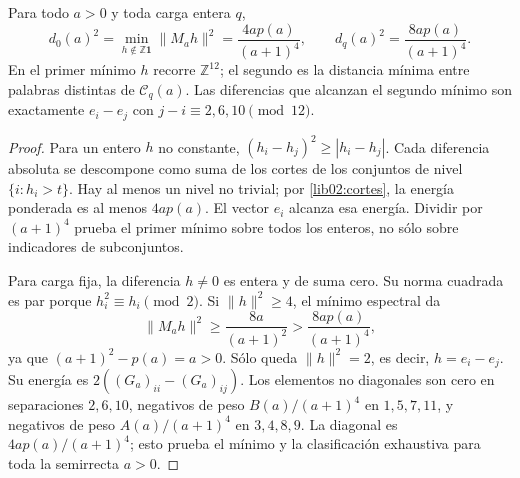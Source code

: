 \begin{theorem}
\label{lib02:distancias}
Para todo \(a>0\) y toda carga entera \(q\),
\begin{equation}
 d_0(a)^2=\min_{h\notin\mathbb Z\mathbf1}\|M_ah\|^2
 =\frac{4ap(a)}{(a+1)^4},\qquad
 d_q(a)^2=\frac{8ap(a)}{(a+1)^4}.
 \label{lib02:distancias-exactas}
\end{equation}
En el primer mínimo \(h\) recorre \(\mathbb Z^{12}\); el segundo
es la distancia mínima entre palabras distintas de \(\mathcal C_q(a)\).
Las diferencias que alcanzan el segundo mínimo son exactamente
\(e_i-e_j\) con \(j-i\equiv2,6,10\pmod{12}\).
\end{theorem}
\begin{proof}
Para un entero \(h\) no constante,
\((h_i-h_j)^2\geq|h_i-h_j|\). Cada diferencia absoluta se
descompone como suma de los cortes de los conjuntos de nivel
\(\{i:h_i>t\}\). Hay al menos un nivel no trivial; por
\cref{lib02:cortes}, la energía ponderada es al menos \(4ap(a)\).
El vector \(e_i\) alcanza esa energía. Dividir por \((a+1)^4\)
prueba el primer mínimo sobre todos los enteros, no sólo sobre
indicadores de subconjuntos.

Para carga fija, la diferencia \(h\ne0\) es entera y de suma cero.
Su norma cuadrada es par porque \(h_i^2\equiv h_i\pmod2\). Si
\(\|h\|^2\geq4\), el mínimo espectral da
\[
 \|M_ah\|^2\geq\frac{8a}{(a+1)^2}
 >\frac{8ap(a)}{(a+1)^4},
\]
ya que \((a+1)^2-p(a)=a>0\). Sólo queda
\(\|h\|^2=2\), es decir, \(h=e_i-e_j\). Su energía es
\(2((G_a)_{ii}-(G_a)_{ij})\). Los elementos no diagonales son cero
en separaciones \(2,6,10\), negativos de peso \(B(a)/(a+1)^4\)
en \(1,5,7,11\), y negativos de peso \(A(a)/(a+1)^4\) en
\(3,4,8,9\). La diagonal es \(4ap(a)/(a+1)^4\); esto prueba el
mínimo y la clasificación exhaustiva para toda la semirrecta \(a>0\).
\end{proof}

